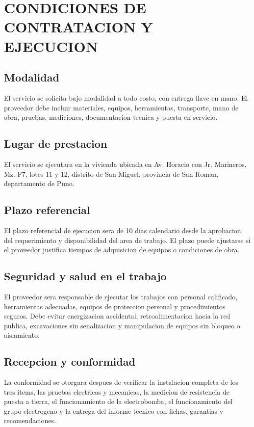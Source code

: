 \documentclass[12pt,letterpaper]{report}
\begin{document}
\section{CONDICIONES DE CONTRATACION Y EJECUCION}

\subsection{Modalidad}

El servicio se solicita bajo modalidad a todo costo, con entrega llave en mano. El proveedor debe incluir materiales, equipos, herramientas, transporte, mano de obra, pruebas, mediciones, documentacion tecnica y puesta en servicio.

\subsection{Lugar de prestacion}

El servicio se ejecutara en la vivienda ubicada en Av. Horacio con Jr. Marineros, Mz. F7, lotes 11 y 12, distrito de San Miguel, provincia de San Roman, departamento de Puno.

\subsection{Plazo referencial}

El plazo referencial de ejecucion sera de 10 dias calendario desde la aprobacion del requerimiento y disponibilidad del area de trabajo. El plazo puede ajustarse si el proveedor justifica tiempos de adquisicion de equipos o condiciones de obra.

\subsection{Seguridad y salud en el trabajo}

El proveedor sera responsable de ejecutar los trabajos con personal calificado, herramientas adecuadas, equipos de proteccion personal y procedimientos seguros. Debe evitar energizacion accidental, retroalimentacion hacia la red publica, excavaciones sin senalizacion y manipulacion de equipos sin bloqueo o aislamiento.

\subsection{Recepcion y conformidad}

La conformidad se otorgara despues de verificar la instalacion completa de los tres items, las pruebas electricas y mecanicas, la medicion de resistencia de puesta a tierra, el funcionamiento de la electrobomba, el funcionamiento del grupo electrogeno y la entrega del informe tecnico con fichas, garantias y recomendaciones.
\end{document}
